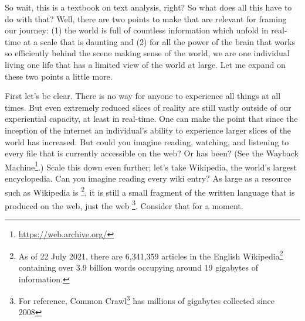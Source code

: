 \documentclass[
  letterpaper,
]{scrbook}
\DeclareRobustCommand{\href}[2]{#2\footnote{\url{#1}}}
\begin{document}
So wait, this is a textbook on text analysis, right? So what does all
this have to do with that? Well, there are two points to make that are
relevant for framing our journey: (1) the world is full of countless
information which unfold in real-time at a scale that is daunting and
(2) for all the power of the brain that works so efficiently behind the
scene making sense of the world, we are one individual living one life
that has a limited view of the world at large. Let me expand on these
two points a little more.

First let's be clear. There is no way for anyone to experience all
things at all times. But even extremely reduced slices of reality are
still vastly outside of our experiential capacity, at least in
real-time. One can make the point that since the inception of the
internet an individual's ability to experience larger slices of the
world has increased. But could you imagine reading, watching, and
listening to every file that is currently accessible on the web? Or has
been? (See the \href{https://web.archive.org/}{Wayback Machine}.) Scale
this down even further; let's take Wikipedia, the world's largest
encyclopedia. Can you imagine reading every wiki entry? As large as a
resource such as Wikipedia is \footnote{As of 22 July 2021, there are
  6,341,359 articles in the
  \href{https://en.wikipedia.org/wiki/English_Wikipedia}{English
  Wikipedia} containing over 3.9 billion words occupying around 19
  gigabytes of information.}, it is still a small fragment of the
written language that is produced on the web, just the web \footnote{For
  reference, \href{https://commoncrawl.org/big-picture/}{Common Crawl}
  has millions of gigabytes collected since 2008}. Consider that for a
moment.
\end{document}
